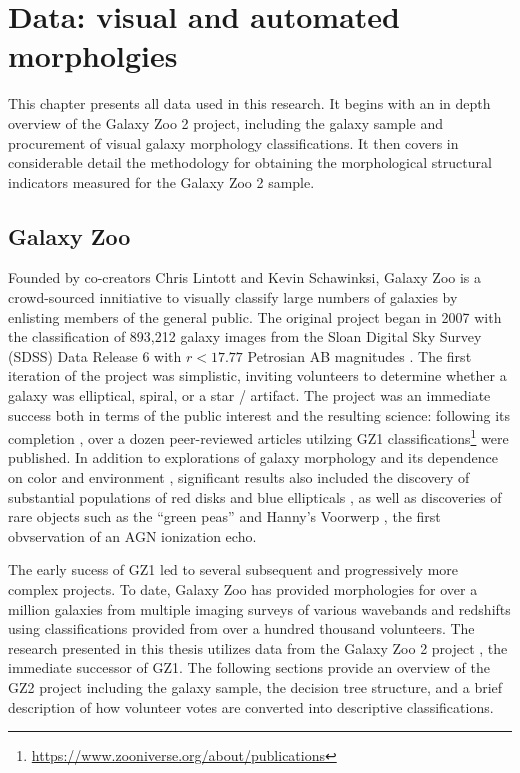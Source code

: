 
\chapter{Data: visual and automated morpholgies}
\label{chap:2}


This chapter presents all data used in this research. It begins with an in depth overview of the Galaxy Zoo 2 project, including the galaxy sample and procurement of visual galaxy morphology classifications. It then covers in considerable detail the methodology for obtaining the morphological structural indicators measured for the Galaxy Zoo 2 sample. 


\section{Galaxy Zoo}
Founded by co-creators Chris Lintott and Kevin Schawinksi, Galaxy Zoo is a crowd-sourced innitiative to visually classify large numbers of galaxies by enlisting members of the general public. The original project \citep[GZ1,][]{Lintott2008} began in 2007 with the classification of 893,212 galaxy images from the Sloan Digital Sky Survey (SDSS) Data Release 6 with $r < 17.77$ Petrosian AB magnitudes \citep{Strauss2002,Adelman2008}. The first iteration of the project was simplistic, inviting volunteers to determine whether a galaxy was elliptical, spiral, or a star / artifact. The project was an immediate success both in terms of the public interest and the resulting science: following its completion \citep{Lintott2008}, over a dozen peer-reviewed articles utilzing GZ1 classifications\footnote{\url{https://www.zooniverse.org/about/publications}} were published. In addition to explorations of galaxy morphology and its dependence on color and environment \citep{Skibba2009, Bamford2009}, significant results also included the discovery of substantial populations of red disks \citep{Masters2010b} and blue ellipticals \citep{Schawinski2009}, as well as discoveries of rare objects such as the ``green peas'' \citep{Cardamone2009} and Hanny's Voorwerp \citep{Lintott2009}, the first obvservation of an AGN ionization echo. 

The early sucess of GZ1 led to several subsequent and progressively more complex projects. To date, Galaxy Zoo has provided morphologies for over a million galaxies from multiple imaging surveys of various wavebands and redshifts using classifications provided from over a hundred thousand volunteers. The research presented in this thesis utilizes data from the Galaxy Zoo 2 project \citep[GZ2,][]{Willett2013}, the immediate successor of GZ1. The following sections provide an overview of the GZ2 project including the galaxy sample, the decision tree structure, and a brief description of how volunteer votes are converted into descriptive classifications. 

